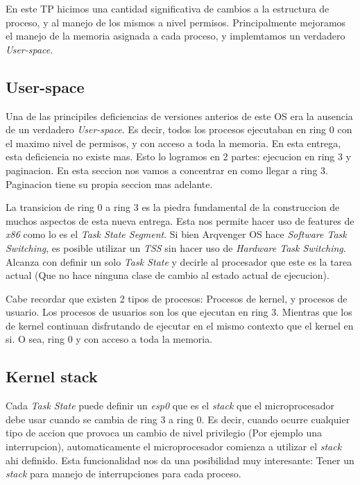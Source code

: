 \documentclass[a4paper,10pt]{article}
\begin{document}
En este TP hicimos una cantidad significativa de cambios a la estructura de proceso, y al manejo de los mismos a nivel permisos.
Principalmente mejoramos el manejo de la memoria asignada a cada proceso, y implemtamos un verdadero \textit{User-space}.

\subsection{User-space}
Una de las principiles deficiencias de versiones anterios de este OS era la ausencia de un verdadero \textit{User-space}.
Es decir, todos los procesos ejecutaban en ring 0 con el maximo nivel de permisos, y con acceso a toda la memoria.
En esta entrega, esta deficiencia no existe mas.
Esto lo logramos en 2 partes: ejecucion en ring 3 y paginacion.
En esta seccion nos vamos a concentrar en como llegar a ring 3. 
Paginacion tiene su propia seccion mas adelante.

La transicion de ring 0 a ring 3 es la piedra fundamental de la construccion de muchos aspectos de esta nueva entrega.
Esta nos permite hacer uso de features de \textit{x86} como lo es el \textit{Task State Segment}.
Si bien Arqvenger OS hace \textit{Software Task Switching}, es posible utilizar un \textit{TSS} sin hacer uso de \textit{Hardware Task Switching}.
Alcanza con definir un solo \textit{Task State} y decirle al procesador que este es la tarea actual (Que no hace ninguna clase de cambio al estado actual de ejecucion).

Cabe recordar que existen 2 tipos de procesos: Procesos de kernel, y procesos de usuario.
Los procesos de usuarios son los que ejecutan en ring 3.
Mientras que los de kernel continuan disfrutando de ejecutar en el mismo contexto que el kernel en si.
O sea, ring 0 y con acceso a toda la memoria.

\subsection{Kernel stack}

Cada \textit{Task State} puede definir un \textit{esp0} que es el \textit{stack} que el microprocesador debe usar cuando se cambia de ring 3 a ring 0.
Es decir, cuando ocurre cualquier tipo de accion que provoca un cambio de nivel privilegio (Por ejemplo una interrupcion), automaticamente el microprocesador comienza a utilizar el \textit{stack} ahi definido.
Esta funcionalidad nos da una posibilidad muy interesante: Tener un \textit{stack} para manejo de interrupciones para cada proceso.
\end{document}
